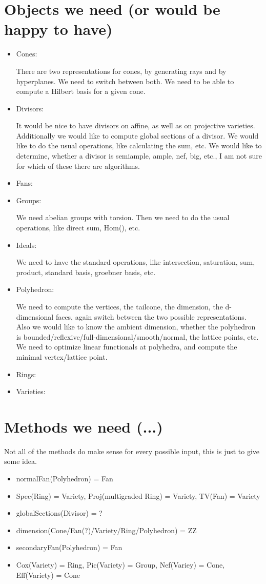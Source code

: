 \documentclass[a4paper]{article}
\begin{document}
\section{Objects we need (or would be happy to have)}
\begin{itemize}
\item Cones: 

There are two representations for cones, by generating rays and by hyperplanes. We need to switch between both.
We need to be able to compute a Hilbert basis for a given cone.
\item Divisors:

It would be nice to have divisors on affine, as well as on projective varieties. Additionally we would like to compute global sections of a divisor.
We would like to do the usual operations, like calculating the sum, etc.
We would like to determine, whether a divisor is semiample, ample, nef, big, etc., I am not sure for which of these there are algorithms.
\item Fans:

\item Groups:

We need abelian groups with torsion. Then we need to do the usual operations, like direct sum, Hom(), etc.
\item Ideals:

We need to have the standard operations, like intersection, saturation, sum, product, standard basis, groebner basis, etc.
\item Polyhedron:

We need to compute the vertices, the tailcone, the dimension, the d-dimensional faces, again switch between the two possible representations.
Also we would like to know the ambient dimension, whether the polyhedron is bounded/reflexive/full-dimensional/smooth/normal, the lattice points, etc.
We need to optimize linear functionals at polyhedra, and compute the minimal vertex/lattice point.
\item Rings:
\item Varieties:

\end{itemize}
\section{Methods we need (...)}
Not all of the methods do make sense for every possible input, this is just to give some idea.
\begin{itemize}
\item normalFan(Polyhedron) = Fan
\item Spec(Ring) = Variety, Proj(multigraded Ring) = Variety, TV(Fan) = Variety
\item globalSections(Divisor) = ?
\item dimension(Cone/Fan(?)/Variety/Ring/Polyhedron) = ZZ
\item secondaryFan(Polyhedron) = Fan
\item Cox(Variety) = Ring, Pic(Variety) = Group, Nef(Variey) = Cone, Eff(Variety) = Cone
\end{itemize}
\end{document}
